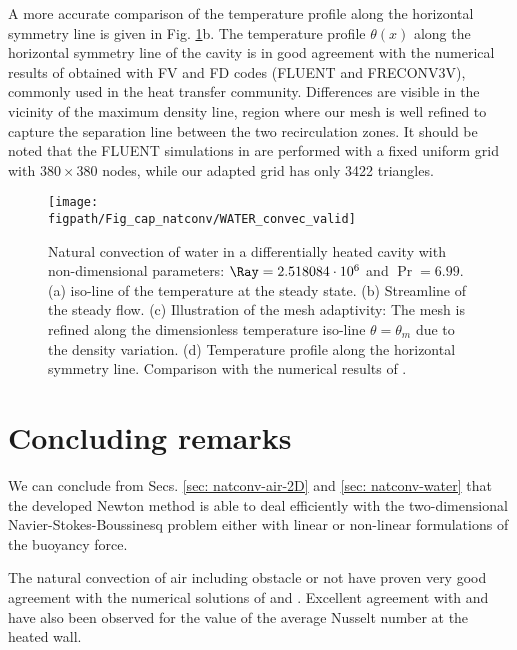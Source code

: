 A more accurate comparison of the temperature profile along the horizontal symmetry line is given in Fig. \ref{fig-T1w-isoT}b. 
The temperature profile $\theta(x)$ along the horizontal symmetry line of the cavity is in good agreement with the numerical results   of \cite{Kowalewski-2003} obtained with FV and FD codes (FLUENT and FRECONV3V), commonly used in the heat transfer community. Differences are visible in the vicinity of the maximum density line, region where our mesh is well refined to capture the separation line between the two recirculation zones. It should be noted that the FLUENT simulations in \cite{Kowalewski-2003} are performed with a fixed uniform grid with $380\times380$ nodes, while our adapted grid has only 3422 triangles.

\begin{figure}
	\begin{center}
		\texttt{[image: \\figpath/Fig\_cap\_natconv/WATER\_convec\_valid]}
	\end{center}
	\caption{Natural convection of water in a differentially heated cavity with non-dimensional parameters: $\Ray=2.518084\cdot 10^{6}$ and $\Pr=6.99$. (a) iso-line of the temperature at the steady state. (b) Streamline of the steady flow. (c) Illustration of the mesh adaptivity: The mesh is refined along the dimensionless temperature iso-line $\theta = \theta_m$ due to the density variation. (d) Temperature profile along the horizontal symmetry line. Comparison with the numerical results of \cite{Kowalewski-2003}.}
	\label{fig-T1w-isoT} %
\end{figure}

\newpage
\section{Concluding remarks}

We can conclude from Secs. \ref{sec: natconv-air-2D} and \ref{sec: natconv-water} that the developed Newton method is able to deal  efficiently with the two-dimensional Navier-Stokes-Boussinesq problem either with linear or non-linear formulations of the buoyancy force.

\noindent The natural convection of air including obstacle or not have proven very good agreement with the numerical solutions of \cite{LeQuere91} and \cite{Raluca2013}.
Excellent agreement with \cite{de1983natural} and \cite{LeQuere91} have also been observed for the value of the average Nusselt number at the heated wall. 

